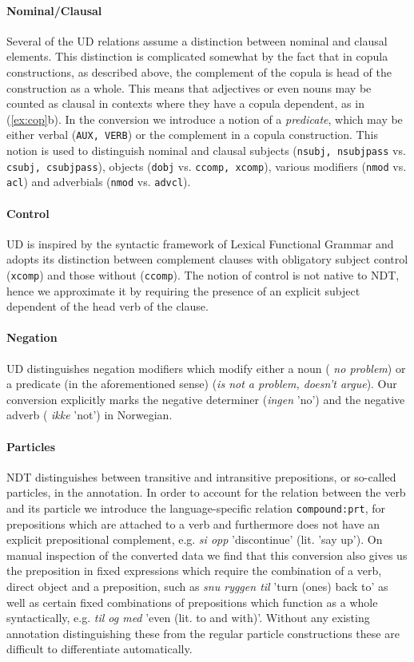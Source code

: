 \documentclass[10pt, a4paper]{article}
\begin{document}
\paragraph{Nominal/Clausal}Several of the UD relations assume a distinction between nominal and
clausal elements. This distinction is complicated somewhat by the fact
that in copula constructions, as described above, the complement of
the copula is head of the construction as a whole. This means that
adjectives or even nouns may be counted as clausal in contexts where
they have a copula dependent, as in (\ref{ex:cop}b).  In the
conversion we introduce a notion of a \emph{predicate}, which may be
either verbal ({\tt AUX, VERB}) or the complement in a copula
construction. This notion is used to distinguish nominal and clausal
subjects ({\tt nsubj, nsubjpass} vs. {\tt csubj, csubjpass}), objects
({\tt dobj} vs. {\tt ccomp, xcomp}), various modifiers ({\tt nmod}
vs. {\tt acl}) and adverbials ({\tt nmod} vs. {\tt advcl}).

\paragraph{Control}UD is inspired by the syntactic framework of Lexical Functional
Grammar \cite{Kap:Bre:82} and adopts its distinction between complement
clauses with obligatory subject control ({\tt xcomp}) and those without
({\tt ccomp}). The notion of control is not native to NDT, hence we
approximate it by requiring the presence of an explicit subject dependent of the
head verb of the clause.


\paragraph{Negation}UD distinguishes negation modifiers which modify either a noun ({\it
  no problem}) or a predicate (in the aforementioned sense) ({\it is
  not a problem, doesn't argue}). Our conversion explicitly marks the
negative determiner ({\it ingen} 'no') and the negative adverb ({\it
  ikke} 'not') in Norwegian.

\paragraph{Particles}NDT distinguishes between transitive and intransitive prepositions, or
so-called particles, in the annotation. In order to account for the
relation between the verb and its particle we introduce the
language-specific relation {\tt compound:prt}, for prepositions which
are attached to a verb and furthermore does not have an explicit prepositional complement,
e.g. {\it si opp} 'discontinue' (lit. 'say up').
On manual inspection of the
converted data we find that this conversion also gives us the
preposition in fixed expressions which require the combination of a
verb, direct object and a preposition, such as {\it snu ryggen til}
'turn (ones) back to' as well as certain fixed combinations of
prepositions which function as a whole syntactically, e.g. {\it til og
  med} 'even (lit. to and with)'. Without any existing annotation
distinguishing these from the regular particle constructions these are
difficult to differentiate automatically.
\end{document}
